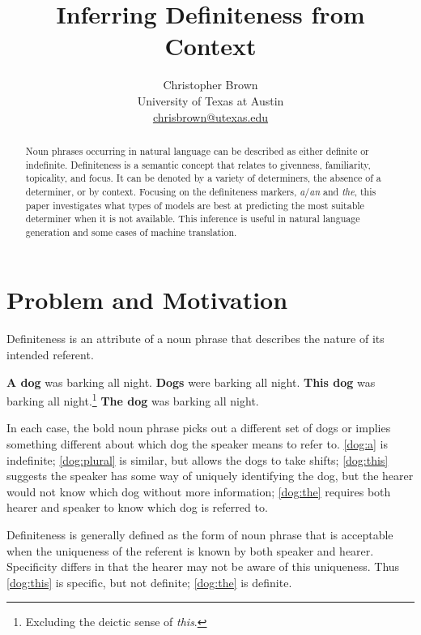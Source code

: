 \documentclass[11pt]{article}\usepackage{graphicx, color}
\title{Inferring Definiteness from Context}
\author{Christopher Brown\\
University of Texas at Austin\\
\href{mailto:chrisbrown@utexas.edu}{chrisbrown@utexas.edu}}
\date{}
\begin{document}
\maketitle

\begin{abstract}
\noindent
Noun phrases occurring in natural language can be described as either definite or indefinite.
Definiteness is a semantic concept that relates to givenness, familiarity, topicality, and focus.
It can be denoted by a variety of determiners, the absence of a determiner, or by context.
Focusing on the definiteness markers, \emph{a}/\emph{an} and \emph{the}, this paper investigates what types of models are best at predicting the most suitable determiner when it is not available. This inference is useful in natural language generation and some cases of machine translation.
\end{abstract}


\section{Problem and Motivation} %
Definiteness is an attribute of a noun phrase that describes the nature of its intended referent.
\begin{exe}
  \ex \textbf{A dog} was barking all night. \label{dog:a}
  \ex \textbf{Dogs} were barking all night. \label{dog:plural}
  \ex \textbf{This dog} was barking all night.\footnote{Excluding the deictic sense of \emph{this}.} \label{dog:this}
  \ex \textbf{The dog} was barking all night. \label{dog:the}
\end{exe}
In each case, the bold noun phrase picks out a different set of dogs or implies something different about which dog the speaker means to refer to. \eqref{dog:a} is indefinite; \eqref{dog:plural} is similar, but allows the dogs to take shifts; \eqref{dog:this} suggests the speaker has some way of uniquely identifying the dog, but the hearer would not know which dog without more information; \eqref{dog:the} requires both hearer and speaker to know which dog is referred to.

Definiteness is generally defined as the form of noun phrase that is acceptable when the uniqueness of the referent is known by both speaker and hearer. Specificity differs in that the hearer may not be aware of this uniqueness. Thus \eqref{dog:this} is specific, but not definite; \eqref{dog:the} is definite.
\end{document}
